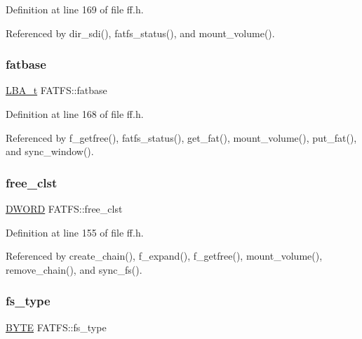 Definition at line 169 of file ff.\+h.



Referenced by dir\+\_\+sdi(), fatfs\+\_\+status(), and mount\+\_\+volume().

\mbox{\label{structFATFS_a78b1024e7d7d086d132a58ee943b31df}} 
\subsubsection{\texorpdfstring{fatbase}{fatbase}}
{\footnotesize\ttfamily \hyperlink{ff_8h_a1f3c30a83148a28340f009d4e583f087}{L\+B\+A\+\_\+t} F\+A\+T\+F\+S\+::fatbase}



Definition at line 168 of file ff.\+h.



Referenced by f\+\_\+getfree(), fatfs\+\_\+status(), get\+\_\+fat(), mount\+\_\+volume(), put\+\_\+fat(), and sync\+\_\+window().

\mbox{\label{structFATFS_ac834248773bf338df807f0d7e6b6a579}} 
\subsubsection{\texorpdfstring{free\+\_\+clst}{free\_clst}}
{\footnotesize\ttfamily \hyperlink{ff_8h_ad342ac907eb044443153a22f964bf0af}{D\+W\+O\+RD} F\+A\+T\+F\+S\+::free\+\_\+clst}



Definition at line 155 of file ff.\+h.



Referenced by create\+\_\+chain(), f\+\_\+expand(), f\+\_\+getfree(), mount\+\_\+volume(), remove\+\_\+chain(), and sync\+\_\+fs().

\mbox{\label{structFATFS_add27d97babe807b573eac98a71dc4ae5}} 
\subsubsection{\texorpdfstring{fs\+\_\+type}{fs\_type}}
{\footnotesize\ttfamily \hyperlink{ff_8h_a4ae1dab0fb4b072a66584546209e7d58}{B\+Y\+TE} F\+A\+T\+F\+S\+::fs\+\_\+type}



